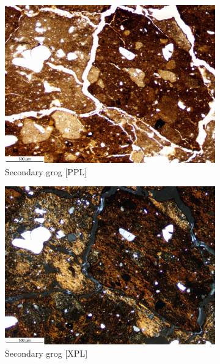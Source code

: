 \documentclass[a4paper]{article}
\begin{document}
\begin{figure}[H]
	\centering
	\begin{subfigure}[t]{.49\textwidth}
		\includegraphics[width=\textwidth]{ThinSections/46-3_4x_PPL.jpg}
		\caption{Secondary grog [PPL]}
	\end{subfigure}\hspace{.5em}\hfill
	\begin{subfigure}[t]{.49\textwidth}
		\includegraphics[width=\textwidth]{ThinSections/46-3_4x_XPL.jpg}
		\caption{Secondary grog [XPL]}
	\end{subfigure}
	\begin{subfigure}[t]{.49\textwidth}

\end{subfigure}
\end{figure}
\end{document}
